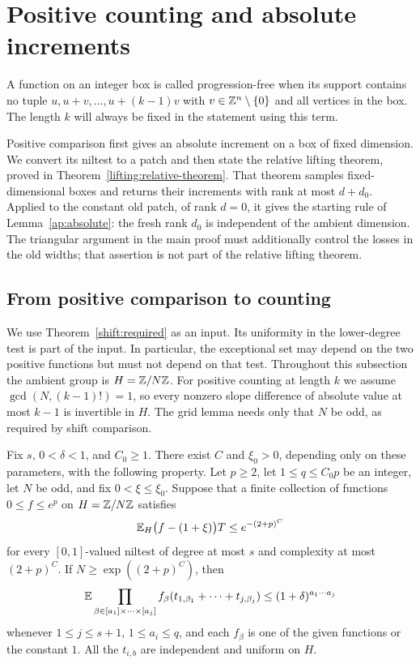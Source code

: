 \section{Positive counting and absolute increments}
\label{counting:section}

A function on an integer box is called progression-free when its support
contains no tuple $u,u+v,\ldots,u+(k-1)v$ with
$v\in\mathbb Z^n\setminus\{0\}$ and all vertices in the box. The length
$k$ will always be fixed in the statement using this term.

Positive comparison first gives an absolute increment on a box of
fixed dimension. We convert its niltest to a patch and then state the
relative lifting theorem, proved in
Theorem~\ref{lifting:relative-theorem}. That theorem samples fixed-dimensional
boxes and returns their increments with rank at most $d+d_0$.
Applied to the constant old patch, of rank $d=0$, it gives the
starting rule of Lemma~\ref{ap:absolute}: the fresh rank $d_0$ is
independent of the ambient dimension. The triangular argument in the
main proof must additionally control the losses in the old widths;
that assertion is not part of the relative lifting theorem.

\subsection{From positive comparison to counting}

We use Theorem~\ref{shift:required} as an input.
Its uniformity in the lower-degree test is part of the input.  In particular,
the exceptional set may depend on the two positive functions but must not
depend on that test.  Throughout this subsection the ambient group is
$H=\mathbb Z/N\mathbb Z$. For positive counting at length $k$ we assume
$\gcd(N,(k-1)!)=1$, so every nonzero slope difference of absolute
value at most $k-1$ is invertible in $H$. The grid lemma needs only
that $N$ be odd, as required by shift comparison.

\begin{lemma}
\label{counting:grids}
Fix $s$, $0<\delta<1$, and $C_0\geq1$.  There exist $C$ and $\xi_0>0$,
depending only on these parameters, with the following property.  Let $p\geq2$,
let $1\leq q\leq C_0p$ be an integer, let $N$ be odd, and fix
$0<\xi\leq\xi_0$. Suppose that a finite collection of functions
$0\leq f\leq e^p$ on $H=\mathbb Z/N\mathbb Z$ satisfies
\[
 \mathbb E_H\bigl(f-(1+\xi)\bigr)T\leq e^{-(2+p)^C}
\]
for every $[0,1]$-valued niltest of degree at most $s$ and complexity at most
$(2+p)^C$.  If $N\geq\exp((2+p)^C)$, then
\begin{equation}\label{counting:grid}
 \mathbb E\prod_{\beta\in[a_1]\times\cdots\times[a_j]}
 f_\beta(t_{1,\beta_1}+\cdots+t_{j,\beta_j})
 \leq (1+\delta)^{a_1\cdots a_j}
\end{equation}
whenever $1\leq j\leq s+1$, $1\leq a_i\leq q$, and each $f_\beta$ is
one of the given functions or the constant $1$.  All the $t_{i,b}$ are
independent and uniform on $H$.
\end{lemma}


